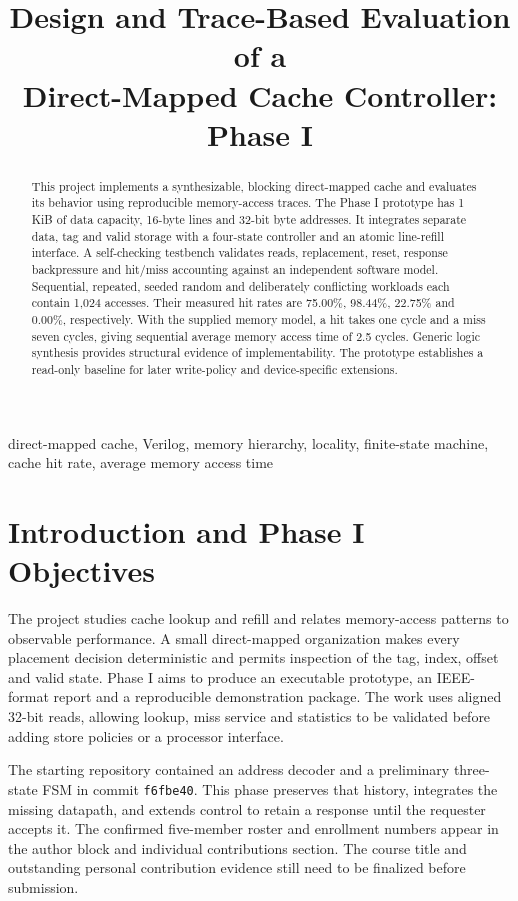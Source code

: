 \documentclass[conference]{IEEEtran}
\title{Design and Trace-Based Evaluation of a\\Direct-Mapped Cache Controller: Phase I}
\author{\IEEEauthorblockN{\TeamNames}
\IEEEauthorblockA{\TeamInstitution\\Undergraduate project: Phase I prototype}}
\begin{document}
\maketitle
\begin{abstract}
This project implements a synthesizable, blocking direct-mapped cache and
evaluates its behavior using reproducible memory-access traces. The Phase I
prototype has 1 KiB of data capacity, 16-byte lines and 32-bit byte addresses.
It integrates separate data, tag and valid storage with a four-state controller
and an atomic line-refill interface. A self-checking testbench validates reads,
replacement, reset, response backpressure and hit/miss accounting against an
independent software model. Sequential, repeated, seeded random and deliberately
conflicting workloads each contain 1,024 accesses. Their measured hit rates are
75.00\%, 98.44\%, 22.75\% and 0.00\%, respectively. With the supplied memory
model, a hit takes one cycle and a miss seven cycles, giving sequential average
memory access time of 2.5 cycles. Generic logic synthesis provides structural
evidence of implementability. The prototype establishes a read-only baseline
for later write-policy and device-specific extensions.
\end{abstract}
\begin{IEEEkeywords}
direct-mapped cache, Verilog, memory hierarchy, locality, finite-state machine,
cache hit rate, average memory access time
\end{IEEEkeywords}

\section{Introduction and Phase I Objectives}
The project studies cache lookup and refill and relates memory-access patterns
to observable performance. A small direct-mapped organization makes every
placement decision deterministic and permits inspection of the tag, index,
offset and valid state. Phase I aims to produce an executable prototype, an
IEEE-format report and a reproducible demonstration package. The work uses
aligned 32-bit reads, allowing lookup, miss service and statistics to be
validated before adding store policies or a processor interface.

The starting repository contained an address decoder and a preliminary
three-state FSM in commit \texttt{f6fbe40}. This phase preserves that history,
integrates the missing datapath, and extends control to retain a response until
the requester accepts it. The confirmed five-member roster and enrollment
numbers appear in the author block and individual contributions section.
The course title and outstanding personal contribution evidence still need
to be finalized before submission.
\end{document}
